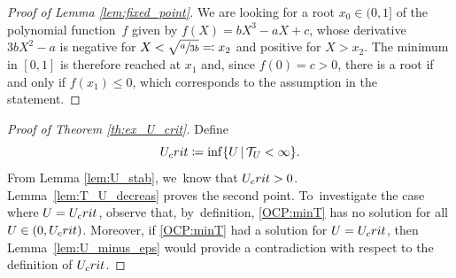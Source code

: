 \documentclass[10pt]{amsart}
\theoremstyle{definition}
\begin{document}
\begin{proof}[Proof of Lemma \ref{lem:fixed_point}]
We are looking for a root $x_0 \in (0, 1]$ of the polynomial function~$f$ given by $f (X) = b X^3 - a X + c$, whose derivative $3 b X^2 - a$ is negative for $X < \sqrt{\sfrac{a}{3 b}} \eqqcolon x_2$ and positive for $X > x_2$. The minimum in $[0, 1]$ is therefore reached at $x_1$ and, since $f (0) = c > 0$, there is a root if and only if $f(x_1) \leq 0$, which corresponds to the assumption in the statement.
\end{proof}

\begin{proof}[Proof of Theorem \ref{th:ex_U_crit}]

Define
\begin{equation*}
U_\textnormal{crit} \coloneqq \inf \{ U \, | \, \mathcal{T}_U < \infty \}.
\end{equation*}
From Lemma \ref{lem:U_stab}, we~know that $U_\textnormal{crit} > 0$. Lemma~\ref{lem:T_U_decreas} proves the second point. To~investigate the case where $U =U_\textnormal{crit}$, observe that, by~definition, \eqref{OCP:minT} has no solution for all $U \in (0, U_\textnormal{crit})$. Moreover, if \eqref{OCP:minT} had a solution for $U = U_\textnormal{crit}$, then Lemma~\ref{lem:U_minus_eps} would provide a contradiction with respect to the definition of $U_\textnormal{crit}$.
\end{proof}
\appendix
\setcounter{section}{1}
\setcounter{theorem}{24}
\end{document}
